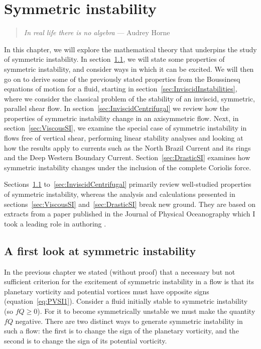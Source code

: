 \chapter{Symmetric instability}
\label{chap:2}
\begin{quote}
    \textit{In real life there is no algebra} --- Audrey Horne
\end{quote}

In this chapter, we will explore the mathematical theory that underpins the study of symmetric instability. In section~\ref{sec:FirstLook}, we will state some properties of symmetric instability, and consider ways in which it can be excited. We will then go on to derive some of the previously stated properties from the Boussinesq equations of motion for a fluid, starting in section~\ref{sec:InviscidInstabilities}, where we consider the classical problem of the stability of an inviscid, symmetric, parallel shear flow. In section~\ref{sec:InviscidCentrifugal} we review how the properties of symmetric instability change in an axisymmetric flow. Next, in section~\ref{sec:ViscousSI}, we examine the special case of symmetric instability in flows free of vertical shear, performing linear stability analyses and looking at how the results apply to currents such as the North Brazil Current and its rings and the Deep Western Boundary Current. Section~\ref{sec:DrasticSI} examines how symmetric instability changes under the inclusion of the complete Coriolis force\footnotemark.

Sections~\ref{sec:FirstLook} to~\ref{sec:InviscidCentrifugal} primarily review well-studied properties of symmetric instability, whereas the analysis and calculations presented in sections~\ref{sec:ViscousSI} and~\ref{sec:DrasticSI} break new ground. They are based on extracts from a paper published in the Journal of Physical Oceanography which I took a leading role in authoring \citep{Goldsworth2021a}.

\section{A first look at symmetric instability}
\label{sec:FirstLook}
In the previous chapter we stated (without proof) that a necessary but not sufficient criterion for the excitement of symmetric instability in a flow is that its planetary vorticity and potential vortices must have opposite signs (equation~\ref{eq:PVSI1}). Consider a fluid initially stable to symmetric instability (so $fQ \geq 0$). For it to become symmetrically unstable we must make the quantity $fQ$ negative. There are two distinct ways to generate symmetric instability in such a flow: the first is to change the sign of the planetary vorticity, and the second is to change the sign of its potential vorticity.


